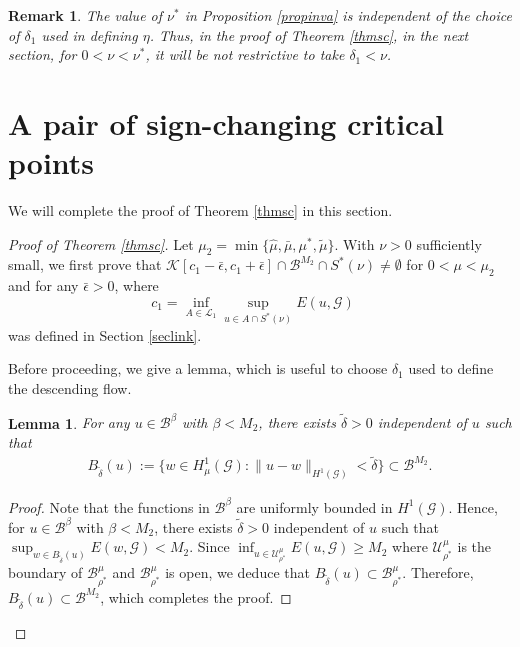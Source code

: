 \documentclass[10pt,a4paper]{article}
\newtheorem{lemma}[theorem]{Lemma}
\newtheorem{remark}[theorem]{Remark}
\theoremstyle{definition} \theoremstyle{remark}
\numberwithin{equation}{section}
\newcommand{\G}{\mathcal{G}}
\newcommand{\B}{\mathcal{B}}
\newcommand{\U}{\mathcal{U}}
\newcommand{\K}{\mathcal{K}}
\newcommand{\s}{\mathbb{S}}
\newcommand{\cl}{\mathcal{L}}
\begin{document}
	\begin{remark}
		The value of $\nu^*$ in Proposition \ref{propinva} is independent of the choice of $\delta_1$ used in defining $\eta$. Thus, in the proof of Theorem \ref{thmsc}, in the next section, for $0 < \nu < \nu^*$, it will be not restrictive to take $\delta_1 < \nu$.
	\end{remark}


\section{A pair of sign-changing critical points} \label{secproof}
	

We will complete the proof of Theorem \ref{thmsc} in this section. 

\begin{proof} [Proof of Theorem \ref{thmsc}]
	
Let $\mu_2 = \min\{\hat{\mu}, \bar{\mu}, \mu^*, \tilde{\mu}\}$. With $\nu > 0$ sufficiently small, we first prove that $\K[c_1-\bar \epsilon,c_1+\bar \epsilon] \cap \B^{M_2} \cap S^*(\nu) \neq \emptyset$ for $0 < \mu < \mu_2$ and for any $\bar \epsilon > 0$, where
$$ c_1 = \inf_{A \in \cl_1}\sup_{u \in A\cap S^*(\nu)}E(u,\G) \quad %
$$
was defined in Section \ref{seclink}. 

Before proceeding, we give a lemma, which is useful to choose $\delta_1$ used to define the descending flow.

\begin{lemma} \label{lembelongtog}
	For any $u \in \B^\beta$ with $\beta < M_2$, there exists $\tilde \delta > 0$ independent of $u$ such that
	\begin{align}
		B_{\tilde \delta}(u) := \bigl\{w \in H^1_\mu(\G): \|u - w\|_{H^1(\G)} < \tilde \delta\bigr\} \subset \B^{M_2}.
	\end{align}
\end{lemma}
\begin{proof}
	Note that the functions in $\B^\beta$ are uniformly bounded in $H^1(\G)$. Hence, for $u \in \B^\beta$ with $\beta < M_2$, there exists $\tilde \delta > 0$ independent of $u$ such that $\sup_{w \in B_{\tilde \delta}(u)}E(w,\G) < M_2$. Since $\inf_{u \in \U_{\rho^*}^\mu}E(u,\G) \geq M_2$ where $\U_{\rho^*}^\mu$ is the boundary of $\B_{\rho^*}^\mu$ and $\B_{\rho^*}^\mu$ is open, we deduce that $B_{\tilde \delta}(u) \subset \B_{\rho^*}^\mu$. Therefore, $B_{\tilde \delta}(u) \subset \B^{M_2}$, which completes the proof.
\end{proof}



\end{proof}
\end{document}
